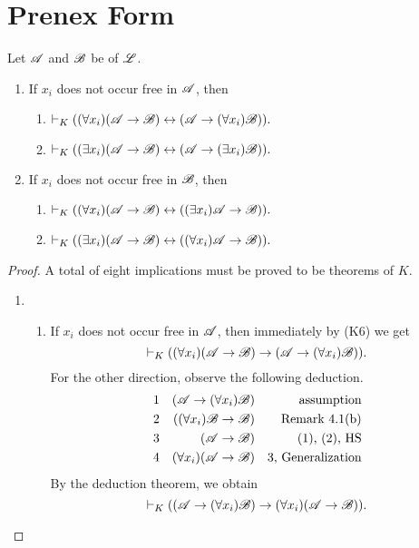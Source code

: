 \section{Prenex Form}

\begin{proposition}
  Let \(\mathscr{A}\) and \(\mathscr{B}\) be \wfs{} of \(\mathscr{L}\).
  \begin{enumerate}
    \item If \(x_i\) does not occur free in \(\mathscr{A}\), then
      \begin{enumerate}
        \item \(\vdash_{K} ((\forall x_i)(\mathscr{A} \rightarrow \mathscr{B}) \leftrightarrow (\mathscr{A} \rightarrow (\forall x_i)\mathscr{B})).\)
        \item \(\vdash_{K} ((\exists x_i)(\mathscr{A} \rightarrow \mathscr{B}) \leftrightarrow (\mathscr{A} \rightarrow (\exists x_i)\mathscr{B})).\)
      \end{enumerate}

    \item If \(x_i\) does not occur free in \(\mathscr{B}\), then
      \begin{enumerate}
        \item \(\vdash_{K} ((\forall x_i)(\mathscr{A} \rightarrow \mathscr{B}) \leftrightarrow ((\exists x_i)\mathscr{A} \rightarrow \mathscr{B})).\)
        \item \(\vdash_{K} ((\exists x_i)(\mathscr{A} \rightarrow \mathscr{B}) \leftrightarrow ((\forall x_i)\mathscr{A} \rightarrow \mathscr{B})).\)
      \end{enumerate}
  \end{enumerate}

  \begin{proof}
    A total of eight implications must be proved to be theorems of \(K\).
    \begin{enumerate}
      \item 
        \begin{enumerate}
          \item If \(x_i\) does not occur free in \(\mathscr{A}\), then immediately by (K6) we get
          \[\vdash_{K} ((\forall x_i)(\mathscr{A} \rightarrow \mathscr{B}) \rightarrow (\mathscr{A} \rightarrow (\forall x_i)\mathscr{B})).\]
          For the other direction, observe the following deduction.
          \begin{align*}
            \text{1}&&
            (\mathscr{A} \rightarrow (\forall x_i)\mathscr{B})&&
            \text{assumption}\\
            \text{2}&&
            ((\forall x_i)\mathscr{B} \rightarrow \mathscr{B})&&
            \text{Remark 4.1(b)}\\
            \text{3}&&
            (\mathscr{A} \rightarrow \mathscr{B})&&
            \text{(1), (2), HS}\\
            \text{4}&&
            (\forall x_i)(\mathscr{A} \rightarrow \mathscr{B})&&
            \text{3, Generalization}
          \end{align*}
          By the deduction theorem, we obtain
            \[\vdash_{K} ((\mathscr{A} \rightarrow (\forall x_i)\mathscr{B}) \rightarrow (\forall x_i)(\mathscr{A} \rightarrow \mathscr{B})).\]
            

\end{enumerate}
\end{enumerate}
\end{proof}
\end{proposition}
